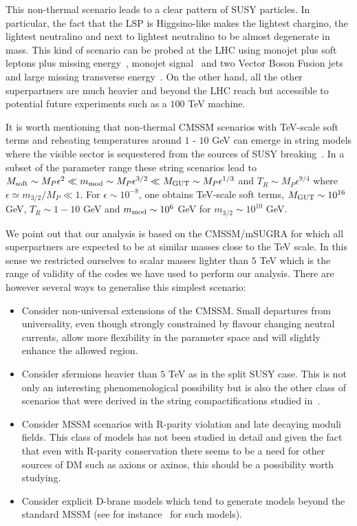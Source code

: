 \documentclass[11pt,a4paper]{article}
\begin{document}
This non-thermal scenario leads to a clear pattern of SUSY particles. In particular, the fact that the LSP is Higgsino-like makes the lightest chargino, the lightest neutralino and next to lightest neutralino to be almost degenerate in mass. This kind of scenario can be probed at the LHC using monojet plus soft leptons plus missing energy~\cite{tata}, monojet signal~\cite{mono} and two Vector Boson Fusion jets and large missing transverse energy~\cite{dutta}. On the other hand, all the other superpartners are much heavier and beyond the LHC reach but accessible to potential future experiments such as a $100$ TeV machine.

It is worth mentioning that non-thermal CMSSM scenarios with TeV-scale soft terms and reheating temperatures around $1$ - $10$ GeV can emerge in string models where the visible sector is sequestered from the sources of SUSY breaking~\cite{seqLVS, Aparicio:2014wxa}. In a subset of the parameter range these string scenarios lead to $M_{\rm soft}\sim M_P \epsilon^2 \ll m_{\rm mod}\sim M_P \epsilon^{3/2} \ll M_{\rm GUT} \sim M_P \epsilon^{1/3}$ and $T_R\sim M_P \epsilon^{9/4}$ where $\epsilon \simeq m_{3/2}/M_P\ll 1$. For $\epsilon \sim 10^{-8}$, one obtains TeV-scale soft terms, $M_{\rm GUT}\sim 10^{16}$ GeV, $T_R\sim 1 -10$ GeV and $m_{\rm mod}\sim 10^6$ GeV for $m_{3/2}\sim 10^{10}$ GeV.

We point out that our analysis is based on the CMSSM/mSUGRA for which all superpartners are expected to be at similar masses close to the TeV scale. In this sense we restricted ourselves to scalar masses lighter than $5$ TeV which is the range of validity of the codes we have used to perform our analysis. There are however several ways to generalise this simplest scenario:
\begin{itemize}
\item Consider non-universal extensions of the CMSSM. Small departures from universality, even though strongly constrained by flavour changing neutral currents, allow more flexibility in the parameter space and will slightly enhance the allowed region.

\item Consider sfermions heavier than $5$ TeV as in the split SUSY case. This is not only an interesting phenomenological possibility but is also the other class of scenarios that were derived in the string compactifications studied in~\cite{seqLVS, Aparicio:2014wxa}.

\item Consider MSSM scenarios with R-parity violation and late decaying moduli fields. This class of models has not been studied in detail and given the fact that even with R-parity conservation there seems to be a need for other sources of DM such as axions or axinos, this should be a possibility worth studying.

\item Consider explicit D-brane models which tend to generate models beyond the standard MSSM (see for instance~\cite{dolan,maharanareview} for such models).
\end{itemize}
\end{document}
